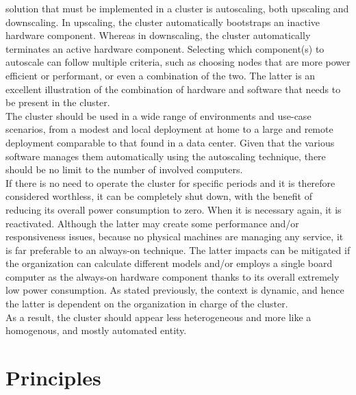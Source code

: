 solution that must be implemented in a cluster is autoscaling, both upscaling and
downscaling. In upscaling, the cluster automatically bootstraps an inactive hardware
component. Whereas in downscaling, the cluster automatically terminates an active
hardware component. Selecting which component(s) to autoscale can follow multiple
criteria, such as choosing nodes that are more power efficient or performant, or
even a combination of the two. The latter is an excellent illustration of the
combination of hardware and software that needs to be present in the cluster. \\ %
The cluster should be used in a wide range of environments and use-case
scenarios, from a modest and local deployment at home to a large and remote deployment
comparable to that found in a data center. Given that the various software
manages them automatically using the autoscaling technique, there should be no limit
to the number of involved computers. \\ %
If there is no need to operate the cluster for specific periods and it is therefore
considered worthless, it can be completely shut down, with the benefit of reducing
its overall power consumption to zero. When it is necessary again, it is reactivated.
Although the latter may create some performance and/or responsiveness issues, because
no physical machines are managing any service, it is far preferable to an always-on
technique. The latter impacts can be mitigated if the organization can calculate
different models and/or employs a single board computer as the always-on hardware
component thanks to its overall extremely low power consumption. As stated
previously, the context is dynamic, and hence the latter is dependent on the
organization in charge of the cluster. \\ %

As a result, the cluster should appear less heterogeneous and more like a
homogenous, and mostly automated entity.

\section{Principles}
\label{sec:introduction_principles}

